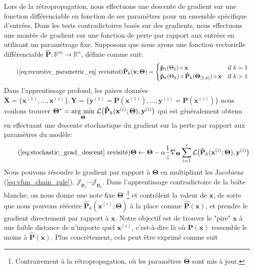 Lors de la rétropropagation, nous effectuons une descente de gradient sur une fonction différenciable en fonction de ses paramètres pour un ensemble spécifique d'entrées. Dans les tests contradictoires basés sur des gradients, nous effectuons une montée de gradient sur une fonction de perte par rapport aux entrées en utilisant un paramétrage fixe. Supposons que nous ayons une fonction vectorielle différenciable $\mathbf{\hat P}: \mathbb{R}^m\rightarrow\mathbb{R}^n$, définie comme suit:
%
\begin{equation} \tag{\autoref{eq:recursive_parametric_eq} revisited}
\mathbf{\hat P}_k(\mathbf{x}; \bm\Theta) = \begin{cases} \mathbf{\hat p}_1(\Theta_1)\circ\mathbf{x} &\text{if } k=1\\ \mathbf{\hat p}_k(\Theta_k)\circ \mathbf{\hat P}_{k}(\bm\Theta_{[1, k]})\circ\mathbf{x}&\text{if } k > 1 \end{cases} \\
\end{equation}
%
Dans l'apprentissage profond, les paires données $\mathbf{X} = \{\mathbf{x}^{(1)}, \dots, \mathbf{x}^{(z)}\}, \mathbf{Y} = \{\mathbf{y}^{(1)} = \mathbf{P}(\mathbf{x}^{(1)}), \dots, \mathbf{y}^{(z)} = \mathbf{P}(\mathbf{x}^{(z)})\}$ nous voulons trouver $\bm\Theta^* = \underset{\boldsymbol{\Theta}}{\operatorname{arg}\,\operatorname{min}}\;\mathcal{L}\big(\mathbf{\hat P}_k(\mathbf{x}^{(i)}; \bm\Theta), \mathbf{y}^{(i)}\big)$ qui est généralement obtenu en effectuant une descente stochastique du gradient sur la perte par rapport aux paramètres du modèle:
%
\begin{equation} \tag{\autoref{eq:stochastic_grad_descent} revisité}
\bm\Theta \leftarrow \bm\Theta - \alpha\frac{1}{z}\nabla_{\bm\Theta} \sum_{i=1}^z\mathcal{L}\big(\mathbf{\hat P}_k(\mathbf{x}^{(i)}; \bm\Theta), \mathbf{y}^{(i)}\big)
\end{equation}
%
Nous pouvons résoudre le gradient par rapport à $\bm\Theta$ en multipliant les Jacobiens (\autoref{eq:vfun_chain_rule}), $\mathcal{J}_{\mathbf{p}_1} \cdots \mathcal{J}_{\mathbf{p}_k}$. Dans l'apprentissage contradictoire de la boîte blanche, on nous donne une note fixe $\bm\Theta$~\footnote{ Contrairement à la rétropropagation, où les paramètres $\bm\Theta$ sont mis à jour. } et contrôlent la valeur de $\mathbf x$, de sorte que nous pouvons réécrire $\mathbf{\hat P}_k(\mathbf{x}^{(i)};\bm\Theta)$ à la place comme $\mathbf{\hat P}(\mathbf x)$, et prendre le gradient directement par rapport à $\mathbf x$. Notre objectif est de trouver le "pire" $\mathbf x$ à une faible distance de n'importe quel $\mathbf x^{(i)}$, c'est-à-dire là où $\mathbf{P}(\mathbf x)$ ressemble le moins à $\mathbf{\hat P}(\mathbf x)$. Plus concrètement, cela peut être exprimé comme suit

